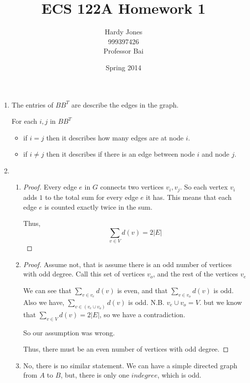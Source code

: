 \documentclass[12pt,letterpaper]{article}
\title{ECS 122A Homework 1\vspace{-2ex}}
\author{Hardy Jones\\
        999397426\\
        Professor Bai\vspace{-2ex}}
\date{Spring 2014}
\begin{document}
  \maketitle

  \begin{enumerate}
    \item
      The entries of $BB^T$ are describe the edges in the graph.

      For each $i, j$ in $BB^T$
      \begin{itemize}
        \item if $i = j$ then it describes how many edges are at node $i$.
        \item if $i \ne j$ then it describes if there is an edge between node $i$ and node $j$.
      \end{itemize}
    \item
      \begin{enumerate}
        \item
          \begin{proof}
            Every edge $e$ in $G$ connects two vertices $v_i, v_j$.
            So each vertex $v_i$ adds $1$ to the total sum for every edge $e$ it has.
            This means that each edge $e$ is counted exactly twice in the sum.

            Thus,
              \[\sum_{v \in V}{d(v)} = 2|E|\]
          \end{proof}
        \item
          \begin{proof}
            Assume not, that is assume there is an odd number of vertices with odd degree.
            Call this set of vertices $v_o$, and the rest of the vertices $v_e$

            We can see that $\sum_{v \in v_e}{d(v)}$ is even,
            and that $\sum_{v \in v_o}{d(v)}$ is odd.
            Also we have, $\sum_{v \in (v_e \cup v_o)}{d(v)}$ is odd.
            N.B. $v_e \cup v_o = V$.
            but we know that $\sum_{v \in V}{d(v)} = 2|E|$,
            so we have a contradiction.

            So our assumption was wrong.

            Thus, there must be an even number of vertices with odd degree.
          \end{proof}
        \item
          No, there is no similar statement.
          We can have a simple directed graph from $A$ to $B$,
          but, there is only one $indegree$, which is odd.
      \end{enumerate}


\end{enumerate}
\end{document}
